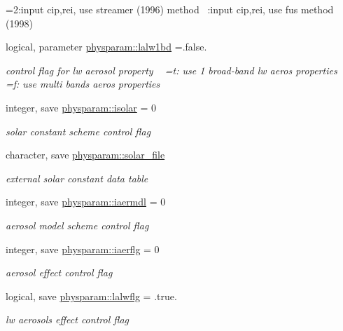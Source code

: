 \begin{DoxyCompactItemize}
\begin{DoxyCompactList}
 =2\+:input cip,rei, use streamer (1996) method ~\+:input cip,rei, use fu\textquotesingle{}s method (1998) \end{DoxyCompactList}\item 
logical, parameter \hyperlink{namespacephysparam_a7ca56a779d7583fcd17b538bf6eb8a84}{physparam\+::lalw1bd} =.false.
\begin{DoxyCompactList}\small\item\em control flag for lw aerosol property ~\newline
 =t\+: use 1 broad-\/band lw aeros properties ~\newline
 =f\+: use multi bands aeros properties \end{DoxyCompactList}\item 
integer, save \hyperlink{namespacephysparam_adf09a9ec1939f1ee47bb4190a9098941}{physparam\+::isolar} = 0
\begin{DoxyCompactList}\small\item\em solar constant scheme control flag \end{DoxyCompactList}\item 
character, save \hyperlink{namespacephysparam_a6472b7762518054a168d4aa915da38f8}{physparam\+::solar\+\_\+file}
\begin{DoxyCompactList}\small\item\em external solar constant data table \end{DoxyCompactList}\item 
integer, save \hyperlink{namespacephysparam_a6fe54722a9d657514d7e4df8f49395fc}{physparam\+::iaermdl} = 0
\begin{DoxyCompactList}\small\item\em aerosol model scheme control flag \end{DoxyCompactList}\item 
integer, save \hyperlink{namespacephysparam_a2b30f07ca3fb04fbfff8c01eb8082e8d}{physparam\+::iaerflg} = 0
\begin{DoxyCompactList}\small\item\em aerosol effect control flag \end{DoxyCompactList}\item 
logical, save \hyperlink{namespacephysparam_aeec2f09912564e297253bf32bf362928}{physparam\+::lalwflg} = .true.
\begin{DoxyCompactList}\small\item\em lw aerosols effect control flag \end{DoxyCompactList}\item 

\end{DoxyCompactItemize}
